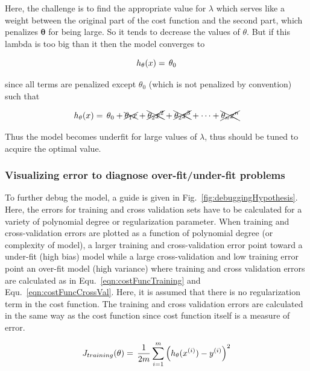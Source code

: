 Here, the challenge is to find the appropriate value for $\lambda$ which serves like a weight between the original part of the cost function and the second part, which penalizes $\bm{\theta}$ for being large. 
So it tends to decrease the values of $\theta$. But if this lambda is too big than it then the model converges to  

\begin{equation}{\label{eqn:costFuncRegularizedTooMuch}}
h_\theta(x)
=\,
\theta_0 
\end{equation} 

since all terms are penalized except $\theta_0$ (which is not penalized by convention) such that

\begin{equation}{\label{eqn:costFuncRegularizedTooMuchHow}}
h_\theta(x)
=\,
\theta_0 + \xcancel{\theta_1 x}  + \xcancel{\theta_2 x^2}  + \xcancel{\theta_2 x^3}  + \cdots + \xcancel{\theta_n x^n}
\end{equation} 

Thus the model becomes underfit for large values of $\lambda$, thus should be tuned to acquire the optimal value.


\subsubsection{Visualizing error to diagnose over-fit/under-fit problems}

To further debug the model, a guide is given in Fig.~\ref{fig:debuggingHypothesis}. 
Here, the errors for training and cross validation sets have to be calculated for a variety of polynomial degree or regularization parameter. 
When training and cross-validation errors are plotted as a function of polynomial degree (or complexity of model), a larger training and cross-validation error point toward a under-fit (high bias) model while a large cross-validation and low training error point an over-fit model (high variance) where training and cross validation errors are calculated as in Equ.~\ref{eqn:costFuncTraining} and Equ.~\ref{eqn:costFuncCrossVal}. 
Here, it is assumed that there is no regularization term in the cost function. The training and cross validation errors are calculated in the same way as the cost function since cost function itself is a measure of error.


\iffalse
\begin{equation}{\label{eqn:trainingError}}
J_{training}(\theta)
=\,
\frac{1}{2m} \sum\limits_{i=1}^{m} \Big(h_\theta(x^{(i)}) - y^{(i)}\Big)^2  
\end{equation} 

